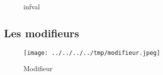 \begin{figure}
  \centering
  \subfloat[infval]{
    
  }\hfill
  \subfloat[infval0]{
    
  }

  \caption{infval}
  \label{fig:select_infval}
\end{figure}

\subsection{Les modifieurs}



\begin{figure}
  \centering
  \texttt{[image: ../../../../tmp/modifieur.jpeg]}
  \caption{Modifieur}
  \label{fig:methode_modifieur}
\end{figure}



